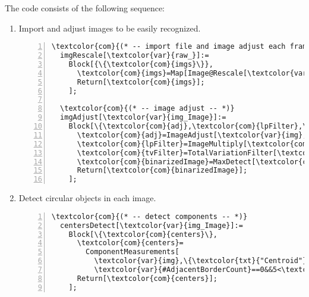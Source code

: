 The code consists of the following sequence:
\begin{enumerate}
  
  \item Import and adjust images to be easily recognized.
  \begin{Verbatim}[commandchars=\\\{\},numbers=left]
  \textcolor{com}{(* -- import file and image adjust each frame -- *)}
  imgRescale[\textcolor{var}{raw_}]:=
    Block[{\{\textcolor{com}{imgs}\}},
      \textcolor{com}{imgs}=Map[Image@Rescale[\textcolor{var}{#},\{0, 65000\}]&,\textcolor{var}{raw}];
      Return[\textcolor{com}{imgs}];
    ];
    
  \textcolor{com}{(* -- image adjust -- *)}
  imgAdjust[\textcolor{var}{img_Image}]:=
    Block[\{\textcolor{com}{adj},\textcolor{com}{lpFilter},\textcolor{com}{tvFilter},\textcolor{com}{binarizedImage}\},
      \textcolor{com}{adj}=ImageAdjust[\textcolor{var}{img},\{0\},\{.001,.07\}];
      \textcolor{com}{lpFilter}=ImageMultiply[\textcolor{com}{adj},LowpassFilter[\textcolor{com}{adj},3]];
      \textcolor{com}{tvFilter}=TotalVariationFilter[\textcolor{com}{lpFilter}];
      \textcolor{com}{binarizedImage}=MaxDetect[\textcolor{com}{tvFilter},.3];
      Return[\textcolor{com}{binarizedImage}];
    ];
  \end{Verbatim}
  
  \item Detect circular objects in each image.
  \begin{Verbatim}[commandchars=\\\{\}, numbers=left]
  \textcolor{com}{(* -- detect components -- *)}
  centersDetect[\textcolor{var}{img_Image}]:=
    Block[\{\textcolor{com}{centers}\},
      \textcolor{com}{centers}=
        ComponentMeasurements[
          \textcolor{var}{img},\{\textcolor{txt}{"Centroid"}\},
          \textcolor{var}{#AdjacentBorderCount}==0&&5<\textcolor{var}{#Area}<400&][[All,2,1]];
      Return[\textcolor{com}{centers}];
    ];
  \end{Verbatim}
  

\end{enumerate}
